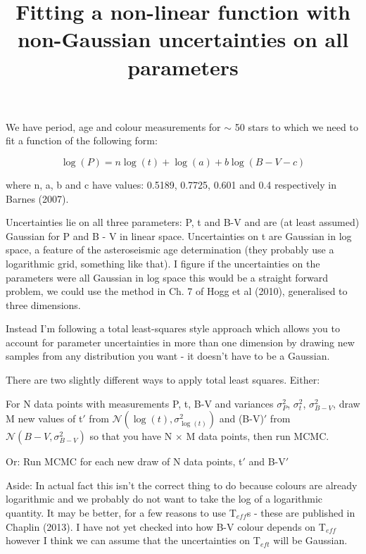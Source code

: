\documentclass[12pt,preprint]{aastex}
\begin{document}
\title{Fitting a non-linear function with non-Gaussian uncertainties on all parameters}

We have period, age and colour measurements for $\sim$ 50 stars to which we need to fit a function of the following form:

\begin{equation}
\log(P) = n\log(t) + \log(a) + b\log(B-V-c)
\label{eq:fitting}
\end{equation}


where n, a, b and c have values: 0.5189, 0.7725, 0.601 and 0.4 respectively in Barnes (2007).

Uncertainties lie on all three parameters: P, t and B-V and are (at least assumed) Gaussian for P and B - V in linear space. Uncertainties on t are Gaussian in log space, a feature of the asteroseismic age determination (they probably use a logarithmic grid, something like that).
I figure if the uncertainties on the parameters were all Gaussian in log space this would be a straight forward problem, we could use the method in Ch. 7 of Hogg et al (2010), generalised to three dimensions.

Instead I'm following a total least-squares style approach which allows you to account for parameter uncertainties in more than one dimension by drawing new samples from any distribution you want - it doesn't have to be a Gaussian. 

There are two slightly different ways to apply total least squares. Either:

For N data points with measurements P, t, B-V and variances $\sigma_P^2$, $\sigma_t^2$, $\sigma_{B-V}^2$, draw M new values of t$\prime$ from $\mathcal{N}(\log(t), \sigma_{\log(t)}^2)$ and (B-V)$\prime$ from $\mathcal{N}(B-V, \sigma_{B-V}^2)$ so that you have N $\times$ M data points, then run MCMC. 

Or:
Run MCMC for each new draw of N data points, t$\prime$ and B-V$\prime$

Aside:
In actual fact this isn't the correct thing to do because colours are already logarithmic and we probably do not want to take the log of a logarithmic quantity.
It may be better, for a few reasons to use T$_{eff}$s - these are published in Chaplin (2013). 
I have not yet checked into how B-V colour depends on T$_{eff}$ however I think we can assume that the uncertainties on T$_{eft}$ will be Gaussian.
\end{document}
